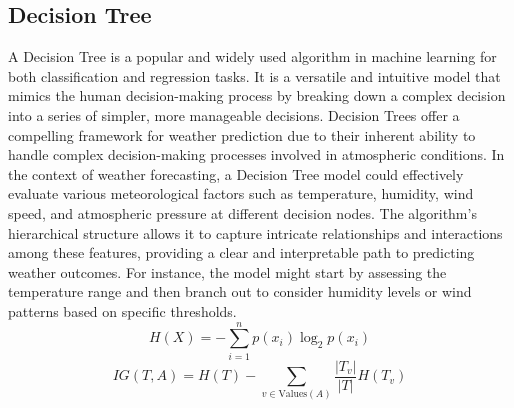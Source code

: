 \documentclass[conference]{IEEEtran}
\begin{document}
\subsection{\textbf{Decision Tree}}
A Decision Tree is a popular and widely used algorithm in machine learning for both classification and regression tasks. It is a versatile and intuitive model that mimics the human decision-making process by breaking down a complex decision into a series of simpler, more manageable decisions. Decision Trees offer a compelling framework for weather prediction due to their inherent ability to handle complex decision-making processes involved in atmospheric conditions. In the context of weather forecasting, a Decision Tree model could effectively evaluate various meteorological factors such as temperature, humidity, wind speed, and atmospheric pressure at different decision nodes. The algorithm's hierarchical structure allows it to capture intricate relationships and interactions among these features, providing a clear and interpretable path to predicting weather outcomes. For instance, the model might start by assessing the temperature range and then branch out to consider humidity levels or wind patterns based on specific thresholds.
\\  \[ H(X) = - \sum_{i=1}^{n} p(x_i) \log_2 p(x_i) \]
\[ IG(T, A) = H(T) - \sum_{v \in \text{Values}(A)} \frac{|T_v|}{|T|} H(T_v) \]
\end{document}
